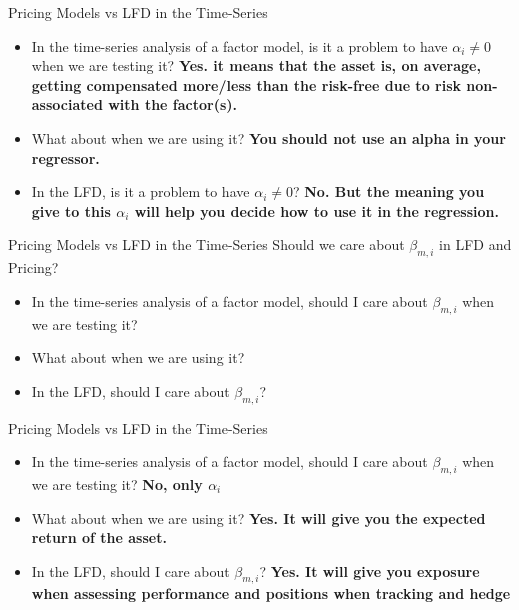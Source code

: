 \documentclass{beamer}
\begin{document}
\begin{frame}{Pricing Models vs LFD in the Time-Series}
    \begin{itemize}
        \item In the time-series analysis of a factor model, is it a problem to have $\alpha_i \neq 0$ when we are testing it? \textbf{Yes. it means that the asset is, on average, getting compensated more/less than the risk-free due to risk non-associated with the factor(s).}
        \item What about when we are using it? \textbf{You should not use an alpha in your regressor.}
        \item In the LFD, is it a problem to have $\alpha_i \neq 0$? \textbf{No. But the meaning you give to this $\alpha_i$ will help you decide how to use it in the regression.}
    \end{itemize}
\end{frame}

\begin{frame}{Pricing Models vs LFD in the Time-Series}
    Should we care about $\beta_{m, i}$ in LFD and Pricing?
    \begin{itemize}
        \item In the time-series analysis of a factor model, should I care about $\beta_{m, i}$ when we are testing it?
        \item What about when we are using it?
        \item In the LFD, should I care about $\beta_{m, i}$?
    \end{itemize}
\end{frame}

\begin{frame}{Pricing Models vs LFD in the Time-Series}
    \begin{itemize}
        \item In the time-series analysis of a factor model, should I care about $\beta_{m, i}$ when we are testing it? \textbf{No, only $\alpha_i$}
        \item What about when we are using it? \textbf{Yes. It will give you the expected return of the asset.}
        \item In the LFD, should I care about $\beta_{m, i}$? \textbf{Yes. It will give you exposure when assessing performance and positions when tracking and hedge}
    \end{itemize}
\end{frame}
\end{document}
